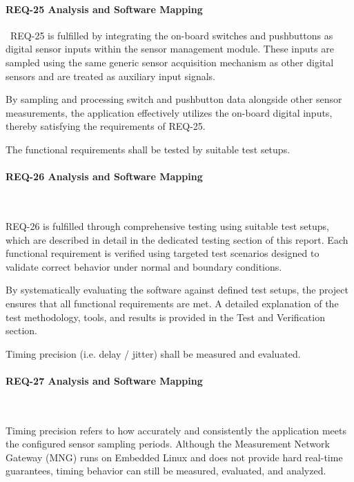 \documentclass{article}
\begin{document}
\paragraph{REQ-25 Analysis and Software Mapping}\
REQ-25 is fulfilled by integrating the on-board switches and pushbuttons as digital 
sensor inputs within the sensor management module. These inputs are sampled using the 
same generic sensor acquisition mechanism as other digital sensors and are treated as 
auxiliary input signals.

By sampling and processing switch and pushbutton data alongside other sensor 
measurements, the application effectively utilizes the on-board digital inputs, 
thereby satisfying the requirements of REQ-25.

\begin{tcolorbox}[
    title=REQ-26,
    colback=gray!5,
    colframe=black,
    fonttitle=\bfseries
]
The functional requirements shall be tested by suitable test setups.
\end{tcolorbox}

\paragraph{REQ-26 Analysis and Software Mapping}\

REQ-26 is fulfilled through comprehensive testing using suitable test setups, which are 
described in detail in the dedicated testing section of this report. Each functional 
requirement is verified using targeted test scenarios designed to validate correct 
behavior under normal and boundary conditions.

By systematically evaluating the software against defined test setups, the project 
ensures that all functional requirements are met. A detailed explanation of the test 
methodology, tools, and results is provided in the Test and Verification section.


\begin{tcolorbox}[
    title=REQ-27,
    colback=gray!5,
    colframe=black,
    fonttitle=\bfseries
]
Timing precision (i.e. delay / jitter) shall be measured and evaluated.
\end{tcolorbox}

\paragraph{REQ-27 Analysis and Software Mapping}\

Timing precision refers to how accurately and consistently the application meets the configured sensor sampling periods.
Although the Measurement Network Gateway (MNG) runs on Embedded Linux and does not provide hard real-time guarantees, timing behavior can still be measured, evaluated, and analyzed.
\end{document}
